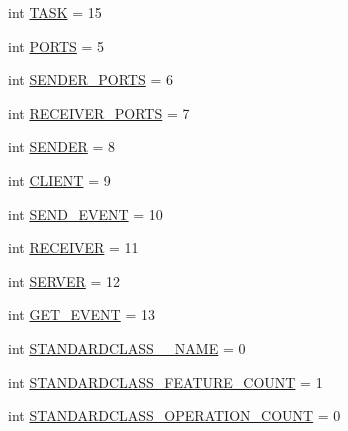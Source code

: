 \begin{DoxyCompactItemize}
\item 
int \hyperlink{interfaceshootingmachineemfmodel_1_1_shootingmachineemfmodel_package_a11c1e4cd4815521f642d021ef075f350}{T\-A\-S\-K} = 15
\item 
int \hyperlink{interfaceshootingmachineemfmodel_1_1_shootingmachineemfmodel_package_a18bf82e2b562ca96327f1cb2b4a5e990}{P\-O\-R\-T\-S} = 5
\item 
int \hyperlink{interfaceshootingmachineemfmodel_1_1_shootingmachineemfmodel_package_a7daade5e29330373c428f1ec50fd984b}{S\-E\-N\-D\-E\-R\-\_\-\-P\-O\-R\-T\-S} = 6
\item 
int \hyperlink{interfaceshootingmachineemfmodel_1_1_shootingmachineemfmodel_package_ad41eaba854eca734766639cd163028bc}{R\-E\-C\-E\-I\-V\-E\-R\-\_\-\-P\-O\-R\-T\-S} = 7
\item 
int \hyperlink{interfaceshootingmachineemfmodel_1_1_shootingmachineemfmodel_package_a249e6702143a85bb37cc88a615e3e085}{S\-E\-N\-D\-E\-R} = 8
\item 
int \hyperlink{interfaceshootingmachineemfmodel_1_1_shootingmachineemfmodel_package_a1c00701cdfb4ee9e77a8d05edc4c89ed}{C\-L\-I\-E\-N\-T} = 9
\item 
int \hyperlink{interfaceshootingmachineemfmodel_1_1_shootingmachineemfmodel_package_ab3c45188557a3e09f02d1f1e98ec9007}{S\-E\-N\-D\-\_\-\-E\-V\-E\-N\-T} = 10
\item 
int \hyperlink{interfaceshootingmachineemfmodel_1_1_shootingmachineemfmodel_package_a4bedda5960870baa89368b22282164bc}{R\-E\-C\-E\-I\-V\-E\-R} = 11
\item 
int \hyperlink{interfaceshootingmachineemfmodel_1_1_shootingmachineemfmodel_package_a508642504c7001bdf5fa4f23a286b880}{S\-E\-R\-V\-E\-R} = 12
\item 
int \hyperlink{interfaceshootingmachineemfmodel_1_1_shootingmachineemfmodel_package_a455c42983e7a26435593b1a895505a0f}{G\-E\-T\-\_\-\-E\-V\-E\-N\-T} = 13
\item 
int \hyperlink{interfaceshootingmachineemfmodel_1_1_shootingmachineemfmodel_package_a06475d7d54d52ee19b2aaf4d5d73c738}{S\-T\-A\-N\-D\-A\-R\-D\-C\-L\-A\-S\-S\-\_\-\-\_\-\-N\-A\-M\-E} = 0
\item 
int \hyperlink{interfaceshootingmachineemfmodel_1_1_shootingmachineemfmodel_package_a14037f66989b3107e402142df96ee9aa}{S\-T\-A\-N\-D\-A\-R\-D\-C\-L\-A\-S\-S\-\_\-\-F\-E\-A\-T\-U\-R\-E\-\_\-\-C\-O\-U\-N\-T} = 1
\item 
int \hyperlink{interfaceshootingmachineemfmodel_1_1_shootingmachineemfmodel_package_a2fe5d848cfe0a02fe5609e2c5ed7e7c7}{S\-T\-A\-N\-D\-A\-R\-D\-C\-L\-A\-S\-S\-\_\-\-O\-P\-E\-R\-A\-T\-I\-O\-N\-\_\-\-C\-O\-U\-N\-T} = 0

\end{DoxyCompactItemize}
